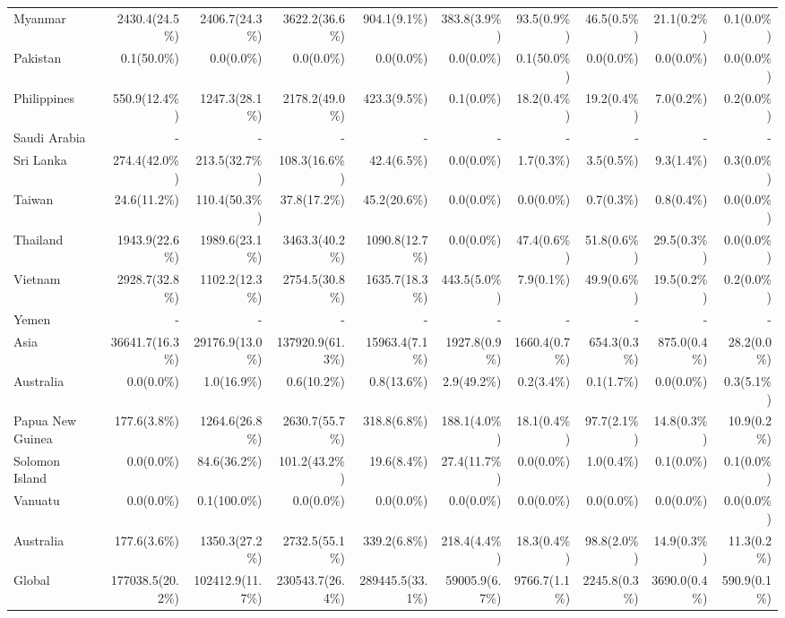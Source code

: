 \begin{scriptsize}
\begin{landscape}
\begin{center}
\begin{longtable}[ht]{lrrrrrrrrr}
			Myanmar&2430.4(24.5\%)&2406.7(24.3\%)&3622.2(36.6\%)&904.1(9.1\%)&383.8(3.9\%)&93.5(0.9\%)&46.5(0.5\%)&21.1(0.2\%)&0.1(0.0\%)\\
			Pakistan&0.1(50.0\%)&0.0(0.0\%)&0.0(0.0\%)&0.0(0.0\%)&0.0(0.0\%)&0.1(50.0\%)&0.0(0.0\%)&0.0(0.0\%)&0.0(0.0\%)\\
			Philippines&550.9(12.4\%)&1247.3(28.1\%)&2178.2(49.0\%)&423.3(9.5\%)&0.1(0.0\%)&18.2(0.4\%)&19.2(0.4\%)&7.0(0.2\%)&0.2(0.0\%)\\
			Saudi Arabia&-&-&-&-&-&-&-&-&-\\
			Sri Lanka&274.4(42.0\%)&213.5(32.7\%)&108.3(16.6\%)&42.4(6.5\%)&0.0(0.0\%)&1.7(0.3\%)&3.5(0.5\%)&9.3(1.4\%)&0.3(0.0\%)\\
			Taiwan&24.6(11.2\%)&110.4(50.3\%)&37.8(17.2\%)&45.2(20.6\%)&0.0(0.0\%)&0.0(0.0\%)&0.7(0.3\%)&0.8(0.4\%)&0.0(0.0\%)\\
			Thailand&1943.9(22.6\%)&1989.6(23.1\%)&3463.3(40.2\%)&1090.8(12.7\%)&0.0(0.0\%)&47.4(0.6\%)&51.8(0.6\%)&29.5(0.3\%)&0.0(0.0\%)\\
			Vietnam&2928.7(32.8\%)&1102.2(12.3\%)&2754.5(30.8\%)&1635.7(18.3\%)&443.5(5.0\%)&7.9(0.1\%)&49.9(0.6\%)&19.5(0.2\%)&0.2(0.0\%)\\
			Yemen&-&-&-&-&-&-&-&-&-\\\hline
			Asia&36641.7(16.3\%)&29176.9(13.0\%)&137920.9(61.3\%)&15963.4(7.1\%)&1927.8(0.9\%)&1660.4(0.7\%)&654.3(0.3\%)&875.0(0.4\%)&28.2(0.0\%)\\\hline
			Australia&0.0(0.0\%)&1.0(16.9\%)&0.6(10.2\%)&0.8(13.6\%)&2.9(49.2\%)&0.2(3.4\%)&0.1(1.7\%)&0.0(0.0\%)&0.3(5.1\%)\\
			Papua New Guinea&177.6(3.8\%)&1264.6(26.8\%)&2630.7(55.7\%)&318.8(6.8\%)&188.1(4.0\%)&18.1(0.4\%)&97.7(2.1\%)&14.8(0.3\%)&10.9(0.2\%)\\
			Solomon Island&0.0(0.0\%)&84.6(36.2\%)&101.2(43.2\%)&19.6(8.4\%)&27.4(11.7\%)&0.0(0.0\%)&1.0(0.4\%)&0.1(0.0\%)&0.1(0.0\%)\\
			Vanuatu&0.0(0.0\%)&0.1(100.0\%)&0.0(0.0\%)&0.0(0.0\%)&0.0(0.0\%)&0.0(0.0\%)&0.0(0.0\%)&0.0(0.0\%)&0.0(0.0\%)\\\hline
			Australia&177.6(3.6\%)&1350.3(27.2\%)&2732.5(55.1\%)&339.2(6.8\%)&218.4(4.4\%)&18.3(0.4\%)&98.8(2.0\%)&14.9(0.3\%)&11.3(0.2\%)\\\hline
			Global&177038.5(20.2\%)&102412.9(11.7\%)&230543.7(26.4\%)&289445.5(33.1\%)&59005.9(6.7\%)&9766.7(1.1\%)&2245.8(0.3\%)&3690.0(0.4\%)&590.9(0.1\%)\\
			\end{longtable}
		\end{center}
	\end{landscape}
\end{scriptsize}
